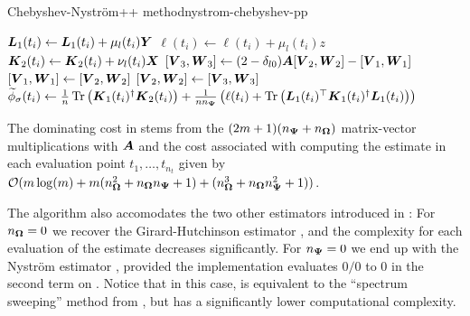 \documentclass[12pt]{article}
\begin{document}
\begin{algo}{Chebyshev-Nyström++ method}{nystrom-chebyshev-pp}
\begin{algorithmic}[1]
            \State $\boldsymbol{L}_1(t_i) \gets \boldsymbol{L}_1(t_i) + \mu_l(t_i) \boldsymbol{Y}$ 
            \State $\ell(t_i) \gets \ell(t_i) + \mu_l(t_i) z$ 
        \EndIf
        \State $\boldsymbol{K}_2(t_i) \gets \boldsymbol{K}_2(t_i) + \nu_l(t_i) \boldsymbol{X}$ 
      \EndFor
      \State $[\boldsymbol{V}_3, \boldsymbol{W}_3] \gets (2 - \delta_{l0}) \boldsymbol{A} [\boldsymbol{V}_2, \boldsymbol{W}_2] - [\boldsymbol{V}_1, \boldsymbol{W}_1]$ 
      \State $[\boldsymbol{V}_1, \boldsymbol{W}_1] \gets [\boldsymbol{V}_2, \boldsymbol{W}_2]$
      \State $[\boldsymbol{V}_2, \boldsymbol{W}_2] \gets [\boldsymbol{V}_3, \boldsymbol{W}_3]$
    \EndFor
      \State $\widetilde{\phi}_{\sigma}(t_i) \gets \frac{1}{n} \operatorname{Tr}\left( \boldsymbol{K}_1(t_i)^{\dagger}\boldsymbol{K}_2(t_i) \right) + \frac{1}{n n_{\boldsymbol{\Psi}}} \left( \ell(t_i) + \operatorname{Tr}\left( \boldsymbol{L}_1(t_i)^{\top} \boldsymbol{K}_1(t_i)^{\dagger} \boldsymbol{L}_1(t_i) \right)  \right) $ \label{lin:4-nystromchebyshev-nystrom-pp}
    \EndFor
\end{algorithmic}
\end{algo}

The dominating cost in  stems from the $(2m + 1)(n_{\boldsymbol{\Psi}} + n_{\boldsymbol{\Omega}})$ matrix-vector multiplications with $\boldsymbol{A}$ and the cost associated with computing the estimate in each evaluation point $t_1, \dots, t_{n_t}$ given by $\mathcal{O}(m \log(m) + m (n_{\boldsymbol{\Omega}}^2 + n_{\boldsymbol{\Omega}} n_{\boldsymbol{\Psi}} + 1) + (n_{\boldsymbol{\Omega}}^3 + n_{\boldsymbol{\Omega}} n_{\boldsymbol{\Psi}}^2 + 1))$.

The algorithm also accomodates the two other estimators introduced in : For $n_{\boldsymbol{\Omega}} = 0$ we recover the Girard-Hutchinson estimator , and the complexity for each evaluation of the estimate decreases significantly. For $n_{\boldsymbol{\Psi}} = 0$ we end up with the Nyström estimator , provided the implementation evaluates $0/0$ to $0$ in the second term on . Notice that in this case,  is equivalent to the \enquote{spectrum sweeping} method from \cite[algorithm 5]{lin-2017-randomized-estimation}, but has a significantly lower computational complexity.
\end{document}

